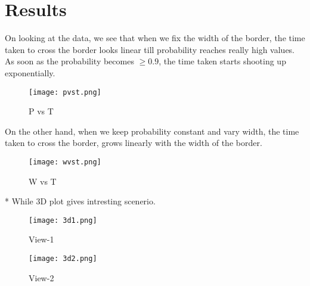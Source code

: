 \documentclass[12pt]{article}
\begin{document}
\section{Results}\label{results}
On looking at the data, we see that when we fix the width of the border, the time taken to cross the border looks linear till probability reaches really high values.
As soon as the probability becomes \(\geq 0.9\), the time taken starts shooting up exponentially.
\newline
\begin{figure}[h!]
        \texttt{[image: pvst.png]}
        \caption{P vs T}
        \label{fig:graph1}
\end{figure}
\newline
On the other hand, when we keep probability constant and vary width, the time taken to cross the border,
grows linearly with the width of the border.
\newline
\begin{figure}[h!]
        \texttt{[image: wvst.png]}
        \caption{W vs T}
        \label{fig:graph2}
\end{figure}
\newline
\newline
\newline
\newline
\newline
\newline
\newline
\newline
\newline
\newline
\newline
\newline
* While 3D plot gives intresting scenerio.
\newline
\begin{figure}[h!]
        \texttt{[image: 3d1.png]}
        \caption{View-1}
        \label{fig:graph3}
\end{figure}
\newline
\newline
\newline
\newline
\newline
\newline
\newline
\newline
\newline
\newline
\newline
\begin{figure}[h!]
        \texttt{[image: 3d2.png]}
        \caption{View-2}
        \label{fig:graph4}
\end{figure}
\newline
\end{document}
